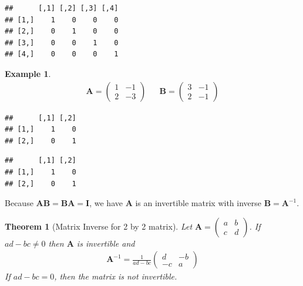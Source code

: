 \documentclass[
]{book}
\newenvironment{Shaded}{\begin{snugshade}}{\end{snugshade}}
\newcommand{\CommentTok}[1]{\textcolor[rgb]{0.56,0.35,0.01}{\textit{#1}}}
\newcommand{\NormalTok}[1]{#1}
\newcommand{\OperatorTok}[1]{\textcolor[rgb]{0.81,0.36,0.00}{\textbf{#1}}}
\newcommand{\StringTok}[1]{\textcolor[rgb]{0.31,0.60,0.02}{#1}}
\newtheorem{theorem}{Theorem}[chapter]
\theoremstyle{definition}
\theoremstyle{definition}
\newtheorem{example}{Example}[chapter]
\theoremstyle{definition}
\theoremstyle{definition}
\theoremstyle{remark}
\begin{document}
\begin{verbatim}
##      [,1] [,2] [,3] [,4]
## [1,]    1    0    0    0
## [2,]    0    1    0    0
## [3,]    0    0    1    0
## [4,]    0    0    0    1
\end{verbatim}

\begin{example}
\[
\begin{aligned}
\mathbf{A} = \begin{pmatrix} 1 & -1 \\ 2 & -3 \end{pmatrix} && \mathbf{B} = \begin{pmatrix} 3 & -1 \\ 2 & -1 \end{pmatrix}
\end{aligned}
\]

\begin{Shaded}
\end{Shaded}

\begin{verbatim}
##      [,1] [,2]
## [1,]    1    0
## [2,]    0    1
\end{verbatim}

\begin{Shaded}
\end{Shaded}

\begin{verbatim}
##      [,1] [,2]
## [1,]    1    0
## [2,]    0    1
\end{verbatim}

Because \(\mathbf{A} \mathbf{B} = \mathbf{B} \mathbf{A} = \mathbf{I}\), we have \(\mathbf{A}\) is an invertible matrix with inverse \(\mathbf{B} = \mathbf{A}^{-1}\).
\end{example}

\begin{theorem}[Matrix Inverse for 2 by 2 matrix]
\protect\hypertarget{thm:matrix-2by2}{}\label{thm:matrix-2by2}Let \(\mathbf{A} = \begin{pmatrix} a & b \\ c & d \end{pmatrix}\). If \(ad - bc \neq 0\) then \(\mathbf{A}\) is invertible and
\[
\begin{aligned}
\mathbf{A}^{-1} = \frac{1}{ad - bc} \begin{pmatrix} d & -b \\ -c & a \end{pmatrix}
\end{aligned}
\]
If \(ad - bc = 0\), then the matrix is not invertible.
\end{theorem}
\end{document}
